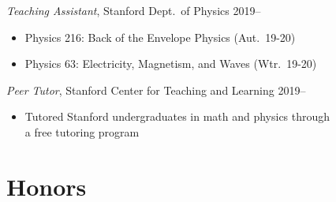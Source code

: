 \documentclass[margin,11pt]{res}
\newenvironment{myitemize}
{ \vspace{-1.5\topsep} \begin{itemize} \setlength\itemsep{0em}}
{ \end{itemize} \vspace{-1.0\topsep}}
\begin{document}
\begin{resume}
\textit{Teaching Assistant}, Stanford Dept.\ of Physics \hfill 2019--\\
\begin{myitemize}
    \item Physics 216: Back of the Envelope Physics (Aut.\ 19-20)
    \item Physics 63: Electricity, Magnetism, and Waves (Wtr.\ 19-20)
\end{myitemize}

\textit{Peer Tutor}, Stanford Center for Teaching and Learning \hfill 2019--\\
\begin{myitemize}
    \item Tutored Stanford undergraduates in math and physics through\\
        a free tutoring program
\end{myitemize}





\section{Honors}
 

\end{resume}
\end{document}
